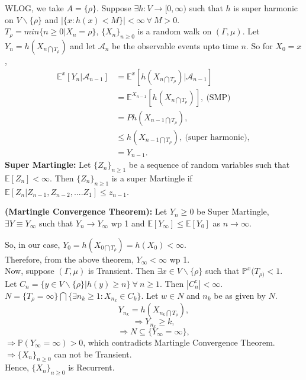 \documentclass[main]{subfiles}
\begin{document}
WLOG, we take $A=\{\rho\}$.
Suppose $\exists h:V\rightarrow [0,\infty)$ such that $h$ is super harmonic on $V\backslash{\{\rho\}}$ and $|\{x:h(x)<M\}|<\infty~\forall ~M>0$.\\
$T_{\rho}=min\{n\geq 0|X_n=\rho\}$, $\{X_n\}_{n\geq 0}$ is a random walk on $(\Gamma,\mu)$.
Let $Y_n=h(X_{n\bigcap T_{\rho}})$ and let $\mathcal{A}_n$ be the observable events upto time $n$. So for $X_0=x$,\\
\begin{align*}
    \mathbb{E}^{x}[Y_n|\mathcal{A}_{n-1}] & =\mathbb{E}^{x}[h(X_{n\bigcap T_{\rho}})|\mathcal{A}_{n-1}]   \\
                                          & =\mathbb{E}^{X_{n-1}}[h(X_{n\bigcap T_{\rho}})],~\text{(SMP)} \\
                                          & =Ph(X_{n-1\bigcap T_{\rho}}),                                 \\
                                          & \leq h(X_{n-1\bigcap T_{\rho}}), ~\text{(super harmonic)},    \\
                                          & = Y_{n-1}.
\end{align*}
\textbf{Super Martingle:} Let $\{Z_n\}_{n\geq 1}$ be a sequence of random variables such that $\mathbb{E}[Z_n]<\infty$. Then $\{Z_n\}_{n\geq 1}$ is a super Martingle if $\mathbb{E}[Z_n|Z_{n-1},Z_{n-2},....Z_1]\leq z_{n-1}$.

\begin{theorem}
    \textbf{(Martingle Convergence Theorem):} Let $Y_n\geq 0$ be Super Martingle, $\exists Y\equiv Y_{\infty}$ such that $Y_n\rightarrow Y_{\infty}$ wp 1 and $\mathbb{E}[Y_{\infty}]\leq\mathbb{E}[Y_0]$ as $n\rightarrow \infty$.
\end{theorem}
So, in our case, $Y_0=h(X_{0\bigcap T_{\rho}})=h(X_0)<\infty$.\\
Therefore, from the above theorem, $Y_{\infty}<\infty$ wp 1.\\
Now, suppose $(\Gamma,\mu)$ is Transient. Then $\exists x\in V\backslash{\{\rho\}}$ such that $\mathbb{P}^x(T_{\rho)}<1$.\\
Let $C_n=\{y\in V\backslash{\{\rho\}}|h(y)\geq n\}~\forall~n\geq 1$. Then $|C_n^c|<\infty$.\\
$N=\{T_\rho=\infty\}\bigcap\{\exists n_k\geq 1: X_{n_k}\in C_k\}$. Let $w\in N$ and $n_k$ be as given by $N$.\\
$$Y_{n_k}=h(X_{n_k \bigcap T_{\rho}}),$$
$$\Rightarrow Y_{n_k}\geq k,$$
$$\Rightarrow N\subseteq \{Y_{\infty}=\infty\},$$
$\Rightarrow\mathbb{P}(Y_{\infty}=\infty)>0$, which contradicts Martingle Convergence Theorem.\\
$\Rightarrow\{X_n\}_{n\geq 0}$ can not be Transient.\\
Hence, $\{X_n\}_{n\geq 0}$ is Recurrent.
\end{document}
